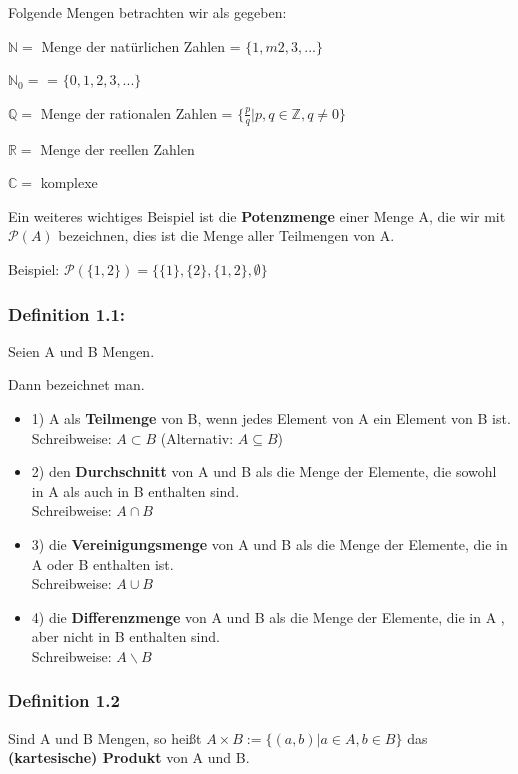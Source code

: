 \documentclass{scrartcl}
\begin{document}
Folgende Mengen betrachten wir als gegeben:

$\mathbb{N} =$ Menge der natürlichen Zahlen = $\{1,m2,3,...\}$

$\mathbb{N}_0 =$ = $\{0,1,2,3,...\}$

$\mathbb{Q} =$ Menge der rationalen Zahlen = $\{\frac{p}{q}| p,q \in \mathbb{Z}, q \neq 0 \}$ 

$\mathbb{R} =$ Menge der reellen Zahlen 

$\mathbb{C} =$ komplexe

Ein weiteres wichtiges Beispiel ist die \textbf{Potenzmenge} einer Menge A, die wir mit $\mathcal{P}(A)$ bezeichnen, dies ist die Menge aller Teilmengen von A.

Beispiel: $\mathcal{P}(\{1,2\})=\{\{1\},\{2\},\{1,2\},\emptyset\}$

\subsubsection{Definition 1.1:}

Seien A und B Mengen.

Dann bezeichnet man.

\begin{itemize}
 \item 1) A als \textbf{Teilmenge} von B, wenn jedes Element von A ein Element von B ist. \\
 Schreibweise: $A \subset B$ (Alternativ: $A \subseteq B$)
 \item 2) den \textbf{Durchschnitt} von A und B als die Menge der Elemente, die sowohl in A als auch in B enthalten sind. \\
 Schreibweise: $A \cap B$
 \item 3) die \textbf{Vereinigungsmenge} von A und B als die Menge der Elemente, die in A oder B enthalten ist. \\
 Schreibweise: $A \cup B$
 \item 4) die \textbf{Differenzmenge} von A und B als die Menge der Elemente, die in A , aber nicht in B enthalten sind. \\
 Schreibweise: $A \backslash B$
\end{itemize}

\subsubsection{Definition 1.2} 

Sind A und B Mengen, so heißt $A \times B := \{(a,b)|a \in A, b \in B\}$
das \textbf{(kartesische) Produkt} von A und B.
\end{document}
